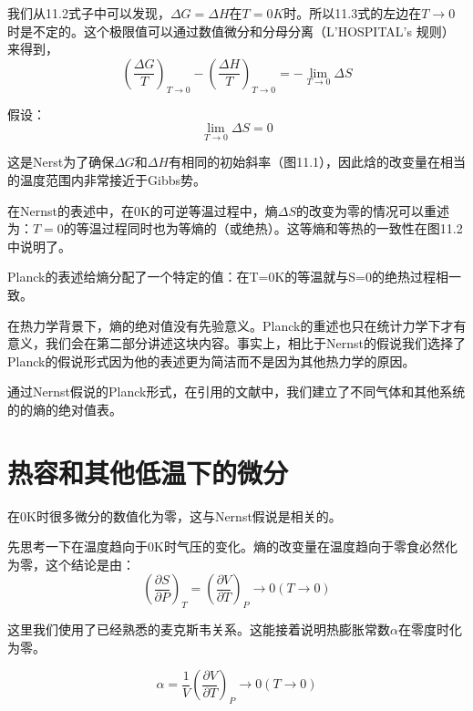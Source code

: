我们从11.2式子中可以发现，$\Delta G= \Delta H$在$T=0K$时。所以11.3式的左边在$T\rightarrow 0$时是不定的。这个极限值可以通过数值微分和分母分离（L'HOSPITAL's 规则）来得到，
\begin{equation}
	(\frac{\Delta G}{T})_{T\rightarrow 0}-(\frac{\Delta H}{T})_{T\rightarrow 0}=- \lim\limits_{T\rightarrow 0} \Delta S	
\end{equation}

假设：
\begin{equation}
	\lim\limits_{T\rightarrow 0} \Delta S=0
\end{equation}

这是Nerst为了确保$\Delta G$和$\Delta H$有相同的初始斜率（图11.1），因此焓的改变量在相当的温度范围内非常接近于Gibbs势。

在Nernst的表述中，在0K的可逆等温过程中，熵$\Delta S$的改变为零的情况可以重述为：$T=0$的等温过程同时也为等熵的（或绝热）。这等熵和等热的一致性在图11.2中说明了。

Planck的表述给熵分配了一个特定的值：在T=0K的等温就与S=0的绝热过程相一致。

在热力学背景下，熵的绝对值没有先验意义。Planck的重述也只在统计力学下才有意义，我们会在第二部分讲述这块内容。事实上，相比于Nernst的假说我们选择了Planck的假说形式因为他的表述更为简洁而不是因为其他热力学的原因。

通过Nernst假说的Planck形式，在引用的文献中，我们建立了不同气体和其他系统的的熵的绝对值表。

\section{热容和其他低温下的微分}
\label{sec11.2}
在0K时很多微分的数值化为零，这与Nernst假说是相关的。

先思考一下在温度趋向于0K时气压的变化。熵的改变量在温度趋向于零食必然化为零，这个结论是由：
\begin{equation}
	(\frac{\partial S}{\partial P})_T=(\frac{\partial V}{\partial T})_P\rightarrow 0 (T\rightarrow 0)
\end{equation}

这里我们使用了已经熟悉的麦克斯韦关系。这能接着说明热膨胀常数$\alpha$在零度时化为零。

\begin{equation}
	\alpha=\frac{1}{V}(\frac{\partial V}{\partial T})_P\rightarrow 0 (T\rightarrow 0)
\end{equation}
$$$$$$$$